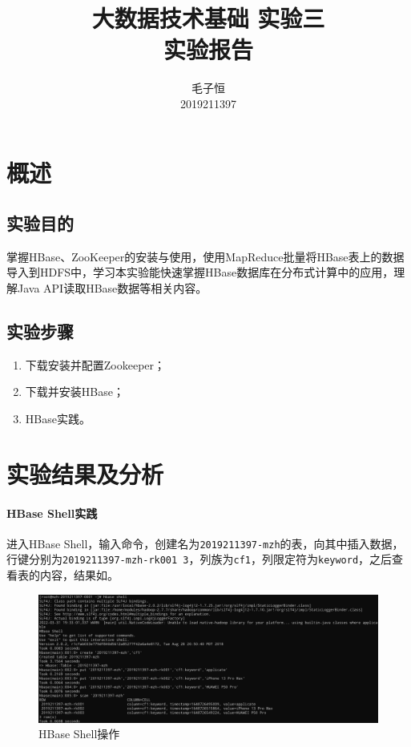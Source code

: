 \documentclass[lang=cn,11pt,a4paper,cite=authornum]{paper}
\title{大数据技术基础 实验三 \\ 实验报告}
\author{毛子恒 \\ 2019211397}
\institute{北京邮电大学\ 计算机学院}
\date{\zhtoday}
\begin{document}
\maketitle

\section{概述}

\subsection{实验目的}

掌握HBase、ZooKeeper的安装与使用，使用MapReduce批量将HBase表上的数据导入到HDFS中，学习本实验能快速掌握HBase数据库在分布式计算中的应用，理解Java API读取HBase数据等相关内容。

\subsection{实验步骤}

\begin{enumerate}
    \item 下载安装并配置Zookeeper；
    \item 下载并安装HBase；
    \item HBase实践。
\end{enumerate}

\section{实验结果及分析}

\paragraph{HBase Shell实践}

进入HBase Shell，输入命令，创建名为\texttt{2019211397-mzh}的表，向其中插入数据，行键分别为\texttt{2019211397-mzh-rk001~3}，列族为\texttt{cf1}，列限定符为\texttt{keyword}，之后查看表的内容，结果如。

\begin{figure}[!htb]
    \centering
    \includegraphics[width=\textwidth]{./images/shell.jpg}
    \caption{HBase Shell操作\label{fig:shell}}
\end{figure}
\end{document}
